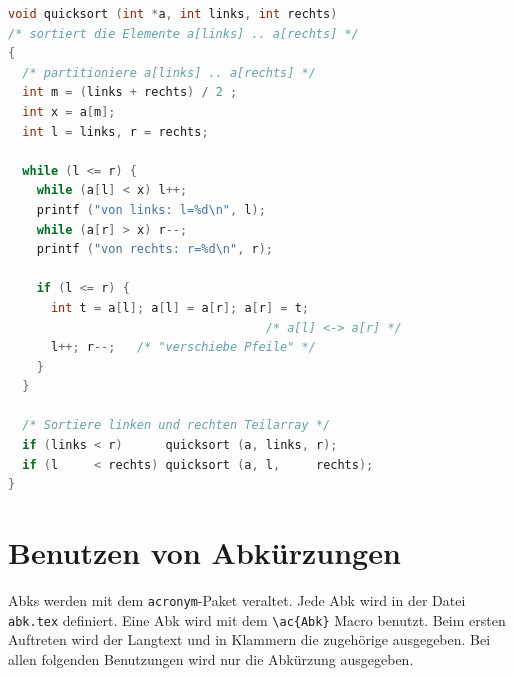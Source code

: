 
\begin{lstlisting}[language=c,
                   frame=single,           % Ein Rahmen um den Code
                   framexleftmargin=15pt,  % Rahmen link von den Zahlen
                   style=algoBericht,
                   label={algo-quicksort},
                   captionpos=b,           % Caption unter den Code setzen
		   caption={quicksort in C}]
void quicksort (int *a, int links, int rechts)
/* sortiert die Elemente a[links] .. a[rechts] */
{
  /* partitioniere a[links] .. a[rechts] */
  int m = (links + rechts) / 2 ;
  int x = a[m];
  int l = links, r = rechts;

  while (l <= r) {
    while (a[l] < x) l++;
    printf ("von links: l=%d\n", l);
    while (a[r] > x) r--;
    printf ("von rechts: r=%d\n", r);

    if (l <= r) {
      int t = a[l]; a[l] = a[r]; a[r] = t;
                                    /* a[l] <-> a[r] */
      l++; r--;   /* "verschiebe Pfeile" */
    }
  }

  /* Sortiere linken und rechten Teilarray */
  if (links < r)      quicksort (a, links, r);
  if (l     < rechts) quicksort (a, l,     rechts);
}
\end{lstlisting}


\section{Benutzen von Abkürzungen}

\acp{Abk} %
werden mit dem \verb+acronym+-Paket veraltet.
Jede
\ac{Abk} %
wird in der Datei \texttt{abk.tex} definiert.
Eine \ac{Abk} wird mit dem \verb+\ac{Abk}+  Macro benutzt. Beim ersten Auftreten
wird der Langtext und in Klammern die zugehörige  ausgegeben. Bei allen
folgenden Benutzungen wird nur die Abkürzung ausgegeben.

